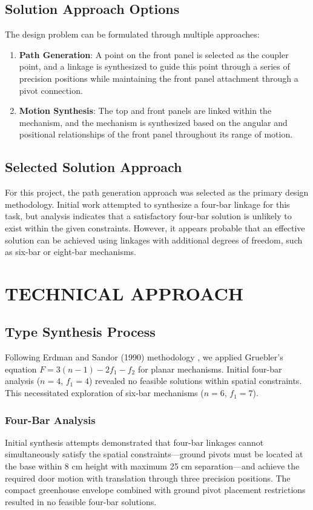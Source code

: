 \documentclass[12pt]{article}
\begin{document}
\subsection*{Solution Approach Options}
The design problem can be formulated through multiple approaches:

\begin{enumerate}
    \item \textbf{Path Generation}: A point on the front panel is selected as the coupler point, and a linkage is synthesized to guide this point through a series of precision positions while maintaining the front panel attachment through a pivot connection.
    
    \item \textbf{Motion Synthesis}: The top and front panels are linked within the mechanism, and the mechanism is synthesized based on the angular and positional relationships of the front panel throughout its range of motion.
\end{enumerate}

\subsection*{Selected Solution Approach}
For this project, the path generation approach was selected as the primary design methodology. Initial work attempted to synthesize a four-bar linkage for this task, but analysis indicates that a satisfactory four-bar solution is unlikely to exist within the given constraints. However, it appears probable that an effective solution can be achieved using linkages with additional degrees of freedom, such as six-bar or eight-bar mechanisms.

\section*{TECHNICAL APPROACH}

\subsection*{Type Synthesis Process}

Following Erdman and Sandor (1990) methodology \cite{Erdman1990}, we applied Gruebler's equation $F = 3(n-1) - 2f_1 - f_2$ for planar mechanisms. Initial four-bar analysis ($n=4$, $f_1=4$) revealed no feasible solutions within spatial constraints. This necessitated exploration of six-bar mechanisms ($n=6$, $f_1=7$).

\subsubsection*{Four-Bar Analysis}
Initial synthesis attempts demonstrated that four-bar linkages cannot simultaneously satisfy the spatial constraints—ground pivots must be located at the base within 8 cm height with maximum 25 cm separation—and achieve the required door motion with translation through three precision positions. The compact greenhouse envelope combined with ground pivot placement restrictions resulted in no feasible four-bar solutions.
\end{document}
